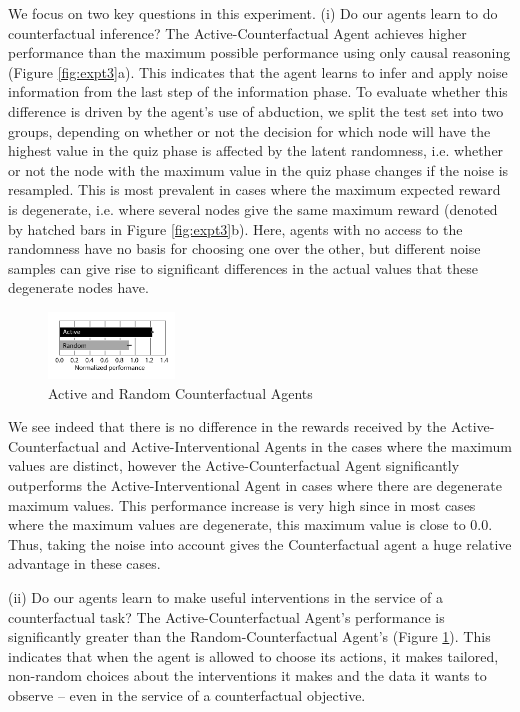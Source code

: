 We focus on two key questions in this experiment. 
(i) Do our agents learn to do counterfactual inference? The Active-Counterfactual Agent achieves higher performance than the maximum possible performance using only causal reasoning (Figure \ref{fig:expt3}a). This indicates that the agent learns to infer and apply noise information from the last step of the information phase. To evaluate whether this difference is driven by the agent's use of abduction, we split the test set into two groups, depending on whether or not the decision for which node will have the highest value in the quiz phase is affected by the latent randomness, i.e. whether or not the node with the maximum value in the quiz phase changes if the noise is resampled.
This is most prevalent in cases where the maximum expected reward is degenerate, i.e. where several nodes give the same maximum reward (denoted by hatched bars in Figure \ref{fig:expt3}b). Here, agents with no access to the randomness have no basis for choosing one over the other, but different noise samples can give rise to significant differences in the actual values that these degenerate nodes have. 

\begin{figure}[h]
\centering
\includegraphics[width=0.3\textwidth]{figures/fig_counterfactual_act_v_pass.pdf} 
\caption{Active and Random Counterfactual Agents}
\label{fig:expt3_active}
\end{figure}

We see indeed that there is no difference in the rewards received by the Active-Counterfactual and Active-Interventional Agents in the cases where the maximum values are distinct, however the Active-Counterfactual Agent significantly outperforms the Active-Interventional Agent in cases where there are degenerate maximum values. This performance increase is very high since in most cases where the maximum values are degenerate, this maximum value is close to 0.0. Thus, taking the noise into account gives the Counterfactual agent a huge relative advantage in these cases.

(ii) Do our agents learn to make useful interventions in the service of a counterfactual task?  The Active-Counterfactual Agent's performance is significantly greater than the Random-Counterfactual Agent's (Figure \ref{fig:expt3_active}). This indicates that when the agent is allowed to choose its actions, it makes tailored, non-random choices about the interventions it makes and the data it wants to observe -- even in the service of a counterfactual objective. 



